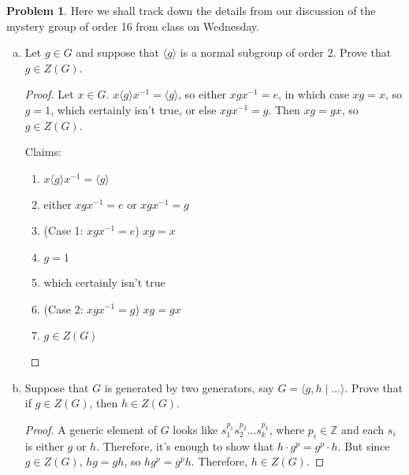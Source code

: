 \documentclass[12pt]{article}
\theoremstyle{definition} %
\newtheorem{problem}{Problem}
\newcommand{\Z}{\mathbb{Z}}
\newcommand\inv{^{-1}} %
\def\<{\langle}
\def\>{\rangle}
\begin{document}
\begin{problem} Here we shall track down the details from our discussion of the mystery group of order 16 from class on Wednesday.
    \begin{enumerate}[(a)]
        \item Let $g\in G$ and suppose that $\<g\>$ is a normal subgroup of order 2. Prove that $g\in Z(G)$.
        \begin{proof}
            Let $x\in G$. $x\<g\>x\inv = \<g\>$, so either $xgx\inv = e$, in which case $xg = x$, so $g = 1$, which certainly isn't true, or else $xgx\inv = g$. Then $xg = gx$, so $g \in Z(G)$.

            Claims:
            \begin{enumerate}[(1)]
                \item $x\<g\>x\inv = \<g\>$
                \item either $xgx\inv = e$ or $xgx\inv = g$
                \item (Case 1: $xgx\inv = e$) $xg = x$
                \item $g=1$
                \item which certainly isn't true
                \item (Case 2: $xgx\inv=g$) $xg = gx$
                \item $g\in Z(G)$
            \end{enumerate}
        \end{proof}
        \item Suppose that $G$ is generated by two generators, say $G = \<g, h \mid \ldots \>$. Prove that if $g\in Z(G)$, then $h\in Z(G)$.
        \begin{proof}
            A generic element of $G$ looks like $s_1^{p_1} s_2^{p_2} \ldots s_k^{p_k}$, where $p_i \in \Z$ and each $s_i$ is either $g$ or $h$. Therefore, it's enough to show that $h\cdot g^p = g^p \cdot h$. But since $g\in Z(G)$, $hg = gh$, so $hg^p = g^ph$. Therefore, $h\in Z(G)$.


\end{proof}
\end{enumerate}
\end{problem}
\end{document}
